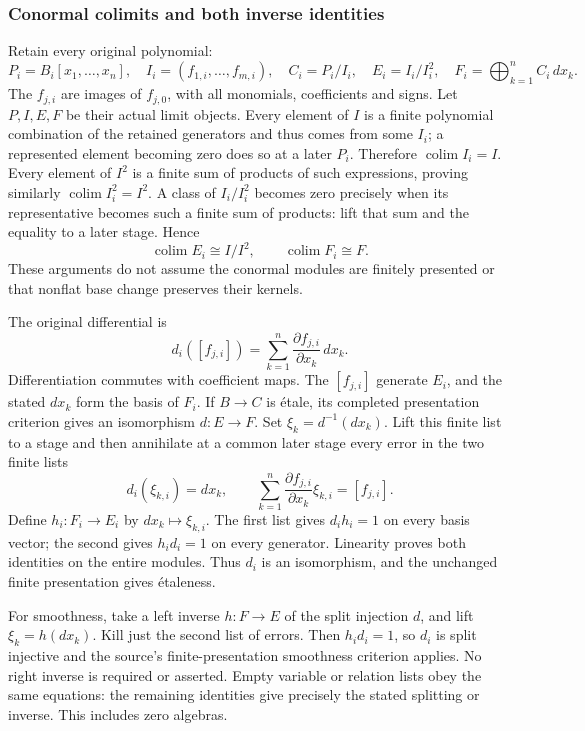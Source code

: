 \subsubsection{Conormal colimits and both inverse identities}\label{conormal-colimits-and-both-inverse-identities}

Retain every original polynomial: \[
P_i=B_i[x_1,\ldots,x_n],\quad I_i=(f_{1,i},\ldots,f_{m,i}),\quad
C_i=P_i/I_i,\quad E_i=I_i/I_i^2,\quad F_i=\bigoplus_{k=1}^n C_i\,dx_k.
\] The \(f_{j,i}\) are images of \(f_{j,0}\), with all monomials, coefficients and signs. Let \(P,I,E,F\) be their actual limit objects. Every element of \(I\) is a finite polynomial combination of the retained generators and thus comes from some \(I_i\); a represented element becoming zero does so at a later \(P_i\). Therefore \(\operatorname{colim}I_i=I\). Every element of \(I^2\) is a finite sum of products of such expressions, proving similarly \(\operatorname{colim}I_i^2=I^2\). A class of \(I_i/I_i^2\) becomes zero precisely when its representative becomes such a finite sum of products: lift that sum and the equality to a later stage. Hence \[
\operatorname{colim}E_i\cong I/I^2,\qquad \operatorname{colim}F_i\cong F.
\] These arguments do not assume the conormal modules are finitely presented or that nonflat base change preserves their kernels.

The original differential is \[
d_i([f_{j,i}])=\sum_{k=1}^n\frac{\partial f_{j,i}}{\partial x_k}\,dx_k.
\] Differentiation commutes with coefficient maps. The \([f_{j,i}]\) generate \(E_i\), and the stated \(dx_k\) form the basis of \(F_i\). If \(B\to C\) is étale, its completed presentation criterion gives an isomorphism \(d:E\to F\). Set \(\xi_k=d^{-1}(dx_k)\). Lift this finite list to a stage and then annihilate at a common later stage every error in the two finite lists \[
d_i(\xi_{k,i})=dx_k,\qquad
\sum_{k=1}^n\frac{\partial f_{j,i}}{\partial x_k}\xi_{k,i}=[f_{j,i}].
\] Define \(h_i:F_i\to E_i\) by \(dx_k\mapsto\xi_{k,i}\). The first list gives \(d_i h_i=1\) on every basis vector; the second gives \(h_i d_i=1\) on every generator. Linearity proves both identities on the entire modules. Thus \(d_i\) is an isomorphism, and the unchanged finite presentation gives étaleness.

For smoothness, take a left inverse \(h:F\to E\) of the split injection \(d\), and lift \(\xi_k=h(dx_k)\). Kill just the second list of errors. Then \(h_i d_i=1\), so \(d_i\) is split injective and the source's finite-presentation smoothness criterion applies. No right inverse is required or asserted. Empty variable or relation lists obey the same equations: the remaining identities give precisely the stated splitting or inverse. This includes zero algebras.

